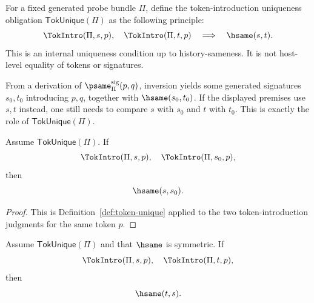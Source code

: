 \begin{definition}
\label{def:token-unique}
For a fixed generated probe bundle \(\Pi\), define the token-introduction uniqueness obligation \(\mathsf{TokUnique}(\Pi)\) as the following principle:
$$
  \TokIntro(\Pi,s,p),\quad
  \TokIntro(\Pi,t,p)
  \quad\Longrightarrow\quad
  \hsame(s,t).
$$
This is an internal uniqueness condition up to history-sameness. It is not host-level equality of tokens or signatures.
\end{definition}

\begin{remark}
From a derivation of \(\psame_{\Pi}^{\mathrm{sig}}(p,q)\), inversion yields some generated signatures \(s_0,t_0\) introducing \(p,q\), together with \(\hsame(s_0,t_0)\). If the displayed premises use \(s,t\) instead, one still needs to compare \(s\) with \(s_0\) and \(t\) with \(t_0\). This is exactly the role of \(\mathsf{TokUnique}(\Pi)\).
\end{remark}

\begin{lemma}
\label{lem:token-replacement-policy}
Assume \(\mathsf{TokUnique}(\Pi)\). If
$$
  \TokIntro(\Pi,s,p),\quad
  \TokIntro(\Pi,s_0,p),
$$
then
$$
  \hsame(s,s_0).
$$
\end{lemma}

\begin{proof}
This is Definition~\ref{def:token-unique} applied to the two token-introduction judgments for the same token \(p\).
\end{proof}

\begin{lemma}
\label{lem:token-replacement-policy-symm}
Assume \(\mathsf{TokUnique}(\Pi)\) and that \(\hsame\) is symmetric. If
$$
  \TokIntro(\Pi,s,p),\quad
  \TokIntro(\Pi,t,p),
$$
then
$$
  \hsame(t,s).
$$
\end{lemma}

